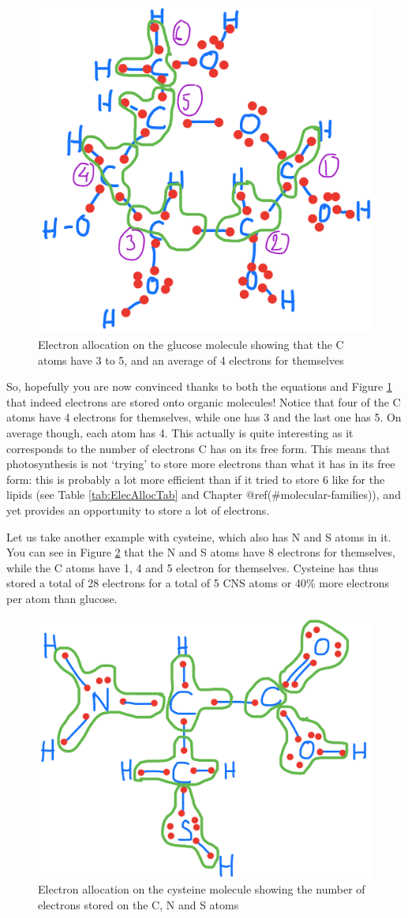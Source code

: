 \documentclass[]{book}
\theoremstyle{definition}
\theoremstyle{definition}
\theoremstyle{definition}
\theoremstyle{remark}
\begin{document}
\begin{figure}

{\centering \includegraphics[width=0.4\linewidth]{pictures/ElecAlloc_glucose} 

}

\caption{Electron allocation on the glucose molecule showing that the C atoms have 3 to 5, and an average of 4 electrons for themselves}\label{fig:ElecAlloc-glucose}
\end{figure}

So, hopefully you are now convinced thanks to both the equations and
Figure \ref{fig:ElecAlloc-glucose} that indeed electrons are stored onto
organic molecules! Notice that four of the C atoms have 4 electrons for
themselves, while one has 3 and the last one has 5. On average though,
each atom has 4. This actually is quite interesting as it corresponds to
the number of electrons C has on its free form. This means that
photosynthesis is not `trying' to store more electrons than what it has
in its free form: this is probably a lot more efficient than if it tried
to store 6 like for the lipids (see Table \ref{tab:ElecAllocTab} and
Chapter @ref(\#molecular-families)), and yet provides an opportunity to
store a lot of electrons.

Let us take another example with cysteine, which also has N and S atoms
in it. You can see in Figure \ref{fig:ElecAlloc-cysteine} that the N and
S atoms have 8 electrons for themselves, while the C atoms have 1, 4 and
5 electron for themselves. Cysteine has thus stored a total of 28
electrons for a total of 5 CNS atoms or 40\% more electrons per atom
than glucose.

\begin{figure}

{\centering \includegraphics[width=0.4\linewidth]{pictures/ElecAlloc_cysteine} 

}

\caption{Electron allocation on the cysteine molecule showing the number of electrons stored on the C, N and S atoms }\label{fig:ElecAlloc-cysteine}
\end{figure}
\end{document}
